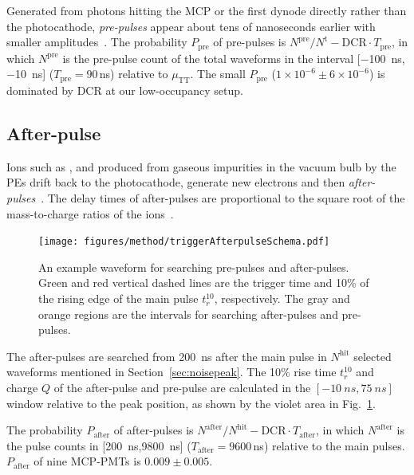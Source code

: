 Generated from photons hitting the MCP or the first dynode directly rather than the photocathode, \emph{pre-pulses} appear about tens of nanoseconds earlier with smaller amplitudes~\cite{JUNOMassTesting}. The probability $P_{\mathrm{pre}}$ of pre-pulses is $N^{\mathrm{pre}}/N^\mathrm{t} - \mathrm{DCR}\cdot T_{\mathrm{pre}}$, in which $N^{\mathrm{pre}}$ is the pre-pulse count of the total waveforms in the interval [\SI{-100}{ns},\SI{-10}{ns}] ($T_{\mathrm{pre}}=90$\,ns) relative to $\mu_{\mathrm{TT}}$. The small $P_{\mathrm{pre}}$ ($1\times10^{-6}\pm6\times10^{-6}$) is dominated by DCR at our low-occupancy setup.

\subsection{After-pulse}
\label{sec:afterpulse}
Ions such as ,  and  produced from gaseous impurities in the vacuum bulb by the PEs drift back to the photocathode, generate new electrons and then \emph{after-pulses}~\cite{JUNOMassTesting,Coates_1973}. The delay times of after-pulses are proportional to the square root of the mass-to-charge ratios of the ions~\cite{XENON1TTesting,Coates_1973,afterpulseTime}. %
\begin{figure}[!htbp]
    \centering
    \texttt{[image: figures/method/triggerAfterpulseSchema.pdf]}
    \caption{An example waveform for searching pre-pulses and after-pulses. Green and red vertical dashed lines are the trigger time and 10\% of the rising edge of the main pulse $t_r^{10}$, respectively. The gray and orange regions are the intervals for searching after-pulses and pre-pulses.}
    \label{fig:afterpulseSchema}
\end{figure}
The after-pulses are searched from \SI{200}{ns} after the main pulse in $N^\mathrm{hit}$ selected waveforms mentioned in Section~\ref{sec:noisepeak}. The 10\% rise time $t_r^{10}$ and charge $Q$ of the after-pulse and pre-pulse are calculated in the $[-\SI{10}{ns},\SI{75}{ns}]$ window relative to the peak position, as shown by the violet area in Fig.~\ref{fig:afterpulseSchema}.

The probability $P_{\mathrm{after}}$ of after-pulses is $N^{\mathrm{after}}/N^\mathrm{hit} - \mathrm{DCR}\cdot T_{\mathrm{after}}$, in which $N^{\mathrm{after}}$ is the pulse counts in [\SI{200}{ns},\SI{9800}{ns}] ($T_{\mathrm{after}}=9600$\,ns) relative to the main pulses. $P_{\mathrm{after}}$ of nine MCP-PMTs is $0.009\pm0.005$.

